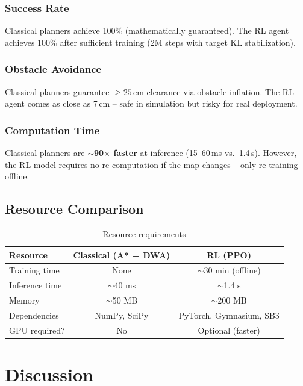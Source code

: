 \documentclass[12pt, a4paper]{article}
\begin{document}
\subsubsection{Success Rate}
Classical planners achieve 100\% (mathematically guaranteed). The RL agent achieves 100\% after sufficient training (2M steps with target KL stabilization).

\subsubsection{Obstacle Avoidance}
Classical planners guarantee $\geq 25$\,cm clearance via obstacle inflation. The RL agent comes as close as 7\,cm -- safe in simulation but risky for real deployment.

\subsubsection{Computation Time}
Classical planners are \textbf{$\sim$90$\times$ faster} at inference (15--60\,ms vs.\ 1.4\,s). However, the RL model requires no re-computation if the map changes -- only re-training offline.

\subsection{Resource Comparison}

\begin{table}[H]
\centering
{}
\caption{Resource requirements}
\begin{tabular}{lcc}
\toprule
\textbf{Resource} & \textbf{Classical (A* + DWA)} & \textbf{RL (PPO)} \\
\midrule
Training time & None & $\sim$30 min (offline) \\
Inference time & $\sim$40 ms & $\sim$1.4 s \\
Memory & $\sim$50 MB & $\sim$200 MB \\
Dependencies & NumPy, SciPy & PyTorch, Gymnasium, SB3 \\
GPU required? & No & Optional (faster) \\
\bottomrule
\end{tabular}
\end{table}

\section{Discussion}
\end{document}
